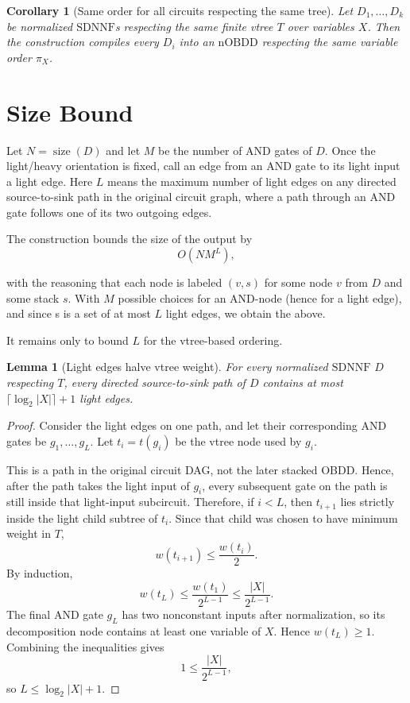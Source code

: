 \documentclass[11pt]{article}
\theoremstyle{plain}
\newtheorem{lemma}[theorem]{Lemma}
\newtheorem{corollary}[theorem]{Corollary}
\theoremstyle{definition}
\theoremstyle{remark}
\newcommand{\size}{\operatorname{size}}
\newcommand{\nOBDD}{\mathrm{nOBDD}}
\newcommand{\SDNNF}{\mathrm{SDNNF}}
\begin{document}
\begin{corollary}[Same order for all circuits respecting the same tree]
Let $D_1,\ldots,D_k$ be normalized $\SDNNF$s respecting the
same finite vtree $T$ over variables $X$.
Then the construction compiles every $D_i$ into an $\nOBDD$ respecting the same
variable order $\pi_X$.
\end{corollary}

\section{Size Bound}

Let $N=\size(D)$ and let $M$ be the number of AND gates of $D$.  Once the
light/heavy orientation is fixed, call an edge from an AND gate to its light
input a light edge.  Here $L$ means the maximum number of light edges on any
directed source-to-sink path in the original circuit graph, where a path through
an AND gate follows one of its two outgoing edges.

The construction bounds the size of the output by
\[
  O(NM^L),
\]

with the reasoning that each node is labeled $(v, s)$ for some node $v$ from $D$ and
some stack $s$. With $M$ possible choices for an AND-node (hence for a light edge), and since
s is a set of at most $L$ light edges, we obtain the above.

It remains only to bound $L$ for the vtree-based ordering.

\begin{lemma}[Light edges halve vtree weight]
For every normalized $\SDNNF$ $D$ respecting $T$,
every directed source-to-sink path of $D$ contains at most
$\lceil \log_2 |X| \rceil + 1$ light edges.
\end{lemma}

\begin{proof}
Consider the light edges on one path, and let their corresponding AND gates be
$g_1,\ldots,g_L$.  Let $t_i=t(g_i)$ be the vtree node used by $g_i$.

This is a path in the original circuit DAG, not the later stacked OBDD.  Hence,
after the path takes the light input of $g_i$, every subsequent gate on the path
is still inside that light-input subcircuit.  Therefore, if $i<L$, then
$t_{i+1}$ lies strictly inside the light child subtree of $t_i$.  Since that
child was chosen to have minimum weight in $T$,
\[
  w(t_{i+1}) \leq \frac{w(t_i)}{2}.
\]
By induction,
\[
  w(t_L) \leq \frac{w(t_1)}{2^{L-1}} \leq \frac{|X|}{2^{L-1}}.
\]
The final AND gate $g_L$ has two nonconstant inputs after normalization, so its
decomposition node contains at least one variable of $X$.  Hence $w(t_L)\geq 1$.
Combining the inequalities gives
\[
  1 \leq \frac{|X|}{2^{L-1}},
\]
so $L \leq \log_2 |X| + 1$.
\end{proof}
\end{document}
